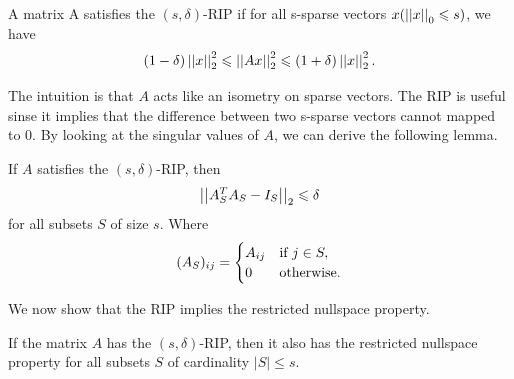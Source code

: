 \documentclass[11pt]{article}
\begin{document}
\begin{definition}
    A matrix A satisfies the \((s,\delta)\)-RIP if for all s-sparse vectors \(x(\left|\left|x\right|\right|_0 \leqslant s)\), we have
    \[(1 - \delta)\left|\left|x\right|\right|_2^2 \leqslant \left|\left|Ax\right|\right|^2_2 \leqslant (1 + \delta)\left|\left|x\right|\right|^2_2.\]
\end{definition}

The intuition is that \(A\) acts like an isometry on sparse vectors. The RIP is useful sinse it implies that the difference between two s-sparse vectors cannot mapped to 0. By looking at the singular values of \(A\), we can derive the following lemma.

\begin{lemma}\label{lem:rip}
    If \(A\) satisfies the \((s,\delta)\)-RIP, then 
    \[\left|\left|A^T_SA_S-I_S\right|\right|_2 \leqslant \delta\]
    for all subsets \(S\) of size \(s\). Where 
    \[(A_S)_{ij} = 
    \begin{cases}
        A_{ij} &\textnormal{if } j \in S,\\
        0 &\textnormal{otherwise}.
    \end{cases}\]
\end{lemma}

We now show that the RIP implies the restricted nullspace property.

\begin{theorem}
    If the matrix \(A\) has the \((s,\delta)\)-RIP, then it also has the restricted nullspace property for all subsets \(S\) of cardinality \(|S| \leqslant s\).
\end{theorem}
\end{document}
